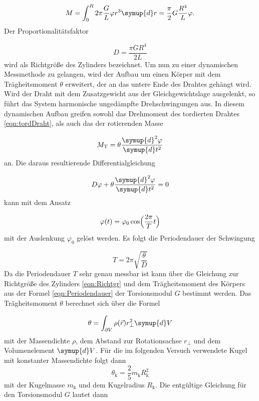 \begin{equation}
  M = \int_{0}^{R} 2\pi \frac{G}{L} \varphi r^3 \symup{d}r = \frac{\pi}{2} G
  \frac{R^4}{L} \varphi.
  \label{eqn:tordDraht}
\end{equation}
Der Proportionalitätsfaktor

\begin{equation}
  D = \frac{\pi G R^4}{2L}
  \label{eqn:Richtgr}
\end{equation}
wird als Richtgröße des Zylinders bezeichnet.
Um nun zu einer dynamischen Messmethode zu gelangen, wird der Aufbau
um einen Körper mit dem Trägheitsmoment $\theta$ erweitert, der an das untere
Ende des Drahtes gehängt wird.
Wird der Draht mit dem Zusatzgewicht aus der Gleichgewichtslage ausgelenkt, so
führt das System harmonische ungedämpfte Drehschwingungen aus. In diesem
dynamischen Aufbau greifen sowohl das Drehmoment des tordierten Drahtes
\eqref{eqn:tordDraht}, als auch das der rotierenden Masse

\begin{equation}
  M_\text{T} = \theta \frac{\symup{d}^2\varphi}{\symup{d}t^2}
\end{equation}
an.
Die daraus resultierende Differentialgleichung

\begin{equation}
  D \varphi + \theta \frac{\symup{d}^2\varphi}{\symup{d}t^2} = 0
  \label{eqn:DrehmomentDGL}
\end{equation}
kann mit dem Ansatz

\begin{equation}
  \varphi(t) = \varphi_0 \cos \Bigl(\frac{2\pi}{T}t\Bigr)
\end{equation}
mit der Auslenkung $\varphi_0$ gelöst werden.
Es folgt die Periodendauer der Schwingung

\begin{equation}
  T = 2\pi \sqrt{\frac{\theta}{D}}
  \label{eqn:Periodendauer}
\end{equation}
Da die Periodendauer $T$ sehr genau messbar ist kann über die
Gleichung zur Richtgröße des Zylinders \eqref{eqn:Richtgr} und dem
Trägheitsmoment des Körpers aus der Formel \eqref{eqn:Periodendauer} der
Torsionsmodul $G$ bestimmt werden.
Das Trägheitsmoment $\theta$ berechnet sich über die Formel

\begin{equation}
  \theta = \int_{\partial V}^{} \rho(\vec{r}) r_\perp^2 \symup{d}V
\end{equation}
mit der Massendichte $\rho$, dem Abstand zur Rotationsachse $r_\perp$ und dem
Volumenelement $\symup{d}V$.
Für die im folgenden Versuch verwendete Kugel mit konstanter Massendichte
folgt dann
\begin{equation}
  \theta_\text{k} = \frac{2}{5} m_\text{k} R_\text{k}^2
\end{equation}
mit der Kugelmasse $m_\text{k}$ und dem Kugelradius $R_\text{k}$.
Die entgültige Gleichung für den Torsionsmodul $G$ lautet dann

